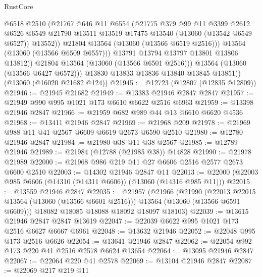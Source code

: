 \begin{lexlean}{RustCore}
\begin{coremodule}
                    @6518
                    @2510
                    (@21767
                      @646
                      @11
                      @6554
                      (@21775
                        @379
                        @99
                        @11
                        @3399
                        @2612
                        @6526
                        @6549
                        @21790
                        @13511
                        @13519
                        @17475
                        @13540
                        (@13060 (@13542 @6549 @6527))
                        @13552))
                    @21804
                    @13564
                    (@13060 (@13566 @6519 @2516)))
                  @13564
                  (@13060 (@13566 @6509 @6557)))
                @13791
                @13794
                @13797
                @13801
                @13806
                @13812))
            @21804
            @13564
            (@13060 (@13566 @6501 @2516)))
          @13564
          (@13060 (@13566 @6427 @6572)))
        @13830
        @13833
        @13836
        @13840
        @13845
        @13851))
    (@13060 (@16020 @21682 @124))
@21945 := @12723 (@12807 (@12835 @12809))
@21946 := @21945 @21682
@21949 := @13383 @21946 @2847 @2847
@21957 := @21949 @990 @995 @1021 @173 @6610 @6622 @2516 @6963
@21959 := @13398 @21946 @2847
@21966 := @21959 @682 @989 @44 @13 @6610 @6620 @4536
@21968 := @13411 @21946 @2847
@21969 := @21968 @209
@21978 := @21969 @988 @11 @41 @2567 @6609 @6619 @2673 @6590 @2510
@21980 := @12780 @21946 @2847
@21984 := @21980 @38 @11 @38 @2567
@21985 := @12789 @21946
@21989 := @21984 (@12788 (@21985 @38)) @14828
@21990 := @21978 @21989
@22000 := @21968 @986 @219 @11 @27 @6606 @2516 @2577 @2673 @6600 @2510
@22003 := @14302 @21946 @2847 @11
@22013 := @22000 (@22003 @985 @6606 (@14310 (@14311 @6606)) (@13060 (@14316 @985 @11)))
@22015 := @13559 @21946 @2847
@22035 := @21957
    (@21966
      (@21990
        (@22013 @22015 @13564 (@13060 (@13566 @6601 @2516)))
        @13564
        (@13060 (@13566 @6591 @6609)))
      @18082
      @18085
      @18088
      @18092
      @18097
      @18103)
@22039 := @13615 @21946 @2847 @2847 @13619
@22047 := @22039 @6622 @995 @1021 @173 @2516 @6627 @6667 @6961
@22048 := @13632 @21946
@22052 := @22048 @995 @173 @2516 @6626
@22054 := @13641 @21946 @2847
@22062 := @22054 @992 @173 @220 @41 @2516 @2578 @6624 @13654
@22064 := @13095 @21946 @2847
@22067 := @22064 @220 @41 @2578
@22069 := @13104 @21946 @2847
@22087 := @22069
    @217
    @219
    @11

\end{coremodule}
\end{lexlean}
